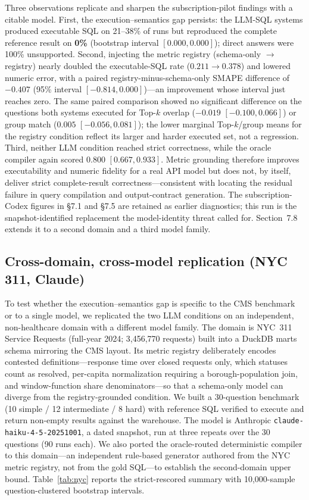 \documentclass[11pt]{article}
\begin{document}
Three observations replicate and sharpen the subscription-pilot findings with a
citable model. First, the execution--semantics gap persists: the LLM-SQL systems
produced executable SQL on 21--38\% of runs but reproduced the complete reference
result on \textbf{0\%} (bootstrap interval $[0.000, 0.000]$); direct answers were
100\% unsupported. Second, injecting the metric registry (schema-only $\rightarrow$
registry) nearly doubled the executable-SQL rate ($0.211 \rightarrow 0.378$) and
lowered numeric error, with a paired registry-minus-schema-only SMAPE difference
of $-0.407$ (95\% interval $[-0.814, 0.000]$)---an improvement whose interval just
reaches zero. The same paired comparison showed no significant difference on the
questions both systems executed for Top-$k$ overlap ($-0.019$ $[-0.100, 0.066]$)
or group match ($0.005$ $[-0.056, 0.081]$); the lower marginal Top-$k$/group means
for the registry condition reflect its larger and harder executed set, not a
regression. Third, neither LLM condition reached strict correctness, while the
oracle compiler again scored 0.800 $[0.667, 0.933]$. Metric grounding therefore
improves executability and numeric fidelity for a real API model but does not, by
itself, deliver strict complete-result correctness---consistent with locating the
residual failure in query compilation and output-contract generation. The
subscription-Codex figures in \S7.1 and \S7.5 are retained as earlier
diagnostics; this run is the snapshot-identified replacement the model-identity
threat called for. Section~7.8 extends it to a second domain and a third model
family.

\subsection{Cross-domain, cross-model replication (NYC 311, Claude)}
To test whether the execution--semantics gap is specific to the CMS benchmark or
to a single model, we replicated the two LLM conditions on an independent,
non-healthcare domain with a different model family. The domain is NYC~311
Service Requests (full-year 2024; 3,456,770 requests) built into a DuckDB marts
schema mirroring the CMS layout. Its metric registry deliberately encodes
contested definitions---response time over closed requests only, which statuses
count as resolved, per-capita normalization requiring a borough-population join,
and window-function share denominators---so that a schema-only model can diverge
from the registry-grounded condition. We built a 30-question benchmark (10 simple
/ 12 intermediate / 8 hard) with reference SQL verified to execute and return
non-empty results against the warehouse. The model is Anthropic
\texttt{claude-haiku-4-5-20251001}, a dated snapshot, run at three repeats over
the 30 questions (90 runs each). We also ported the oracle-routed deterministic
compiler to this domain---an independent rule-based generator authored from the
NYC metric registry, not from the gold SQL---to establish the second-domain upper
bound. Table~\ref{tab:nyc} reports the strict-rescored summary with 10,000-sample
question-clustered bootstrap intervals.
\end{document}
